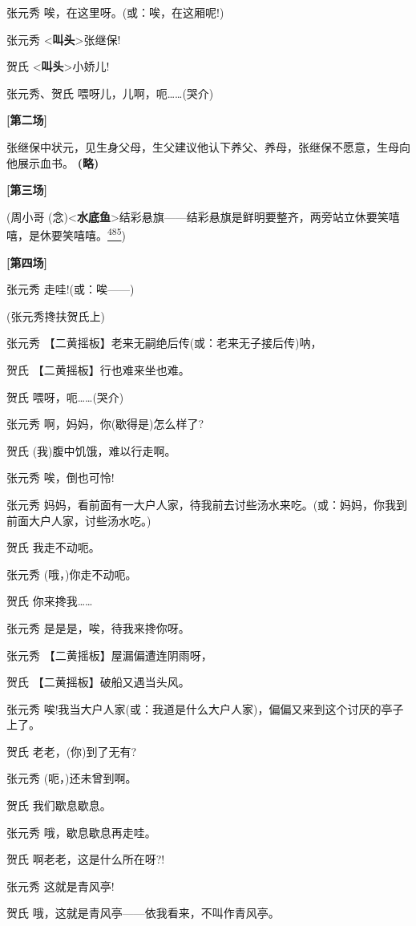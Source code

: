 张元秀 唉，在这里呀。(或：唉，在这厢呢!)

张元秀 \textless{}\textbf{叫头}\textgreater{}张继保!

贺氏 \textless{}\textbf{叫头}\textgreater{}小娇儿!

张元秀、贺氏 喂呀儿，儿啊，呃\ldots{}\ldots{}(哭介)

\textbf{{[}第二场{]}}

张继保中状元，见生身父母，生父建议他认下养父、养母，张继保不愿意，生母向他展示血书。
\textbf{(略)}

\textbf{{[}第三场{]}}

(周小哥
(念)\textless{}\textbf{水底鱼}\textgreater{}结彩悬旗------结彩悬旗是鲜明要整齐，两旁站立休要笑嘻嘻，是休要笑嘻嘻。\protect\hyperlink{fn485}{\textsuperscript{485}})

\textbf{{[}第四场{]}}

张元秀 走哇!(或：唉------)

(张元秀搀扶贺氏上)

张元秀 【二黄摇板】老来无嗣绝后传(或：老来无子接后传)呐，

贺氏 【二黄摇板】行也难来坐也难。

贺氏 喂呀，呃\ldots{}\ldots{}(哭介)

张元秀 啊，妈妈，你(歇得是)怎么样了?

贺氏 (我)腹中饥饿，难以行走啊。

张元秀 唉，倒也可怜!

张元秀
妈妈，看前面有一大户人家，待我前去讨些汤水来吃。(或：妈妈，你我到前面大户人家，讨些汤水吃。)

贺氏 我走不动呃。

张元秀 (哦，)你走不动呃。

贺氏 你来搀我\ldots{}\ldots{}

张元秀 是是是，唉，待我来搀你呀。

张元秀 【二黄摇板】屋漏偏遭连阴雨呀，

贺氏 【二黄摇板】破船又遇当头风。

张元秀
唉!我当大户人家(或：我道是什么大户人家)，偏偏又来到这个讨厌的亭子上了。

贺氏 老老，(你)到了无有?

张元秀 (呃，)还未曾到啊。

贺氏 我们歇息歇息。

张元秀 哦，歇息歇息再走哇。

贺氏 啊老老，这是什么所在呀?!

张元秀 这就是青风亭!

贺氏 哦，这就是青风亭------依我看来，不叫作青风亭。

